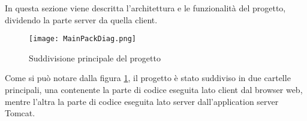 In questa sezione viene descritta l'architettura e le funzionalità del progetto, dividendo la parte server da quella client.
\begin{figure}[!htb]
\centering%
\texttt{[image: MainPackDiag.png]}%
\caption{Suddivisione principale del progetto}\label{fig:umlPackDiag}%
\end{figure}

Come si può notare dalla figura \ref{fig:umlPackDiag}, il progetto è stato suddiviso in due cartelle principali, una  contenente la parte di codice eseguita lato client dal browser web, mentre 
l’altra  la parte di codice eseguita lato server dall’application server Tomcat.